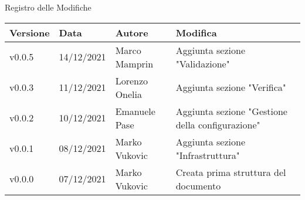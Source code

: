 \begin{center}
  \huge{Registro delle Modifiche}
\end{center}

\begin{center}
  \begin{tabular}{|p{2cm}|p{2cm}|p{3cm}|p{5cm}|}
    \hline
    \textbf{Versione} & \textbf{Data} & \textbf{Autore} & \textbf{Modifica}                    \\ \hline
    v0.0.5            & 14/12/2021    & Marco Mamprin   & Aggiunta sezione "Validazione" \\ \hline
    v0.0.3            & 11/12/2021    & Lorenzo Onelia  & Aggiunta sezione "Verifica" \\ \hline
    v0.0.2            & 10/12/2021    & Emanuele Pase   & Aggiunta sezione "Gestione della configurazione" \\ \hline
    v0.0.1            & 08/12/2021    & Marko Vukovic   & Aggiunta sezione "Infrastruttura" \\ \hline
    v0.0.0            & 07/12/2021    & Marko Vukovic   & Creata prima struttura del documento \\ \hline
  \end{tabular}
\end{center}
